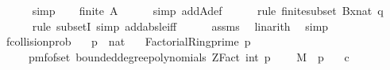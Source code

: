 \begin{isabellebody}
\ \ \ \ \isamarkupfalse%
\ simp\isanewline
\ \ \isamarkupfalse%
\ {\isachardoublequoteopen}finite\ A{\isachardoublequoteclose}\isanewline
\ \ \ \ \isamarkupfalse%
\ {\isacharparenleft}{\kern0pt}simp\ add{\isacharcolon}{\kern0pt}A{\isacharunderscore}{\kern0pt}def{\isacharparenright}{\kern0pt}\isanewline
\ \ \ \ \isamarkupfalse%
\ {\isacharparenleft}{\kern0pt}rule\ finite{\isacharunderscore}{\kern0pt}subset{\isacharbrackleft}{\kern0pt}\ B{\isacharequal}{\kern0pt}{\isachardoublequoteopen}{\isacharbraceleft}{\kern0pt}{}{\isachardot}{\kern0pt}{\isachardot}{\kern0pt}x{\isacharplus}{\kern0pt}nat\ {\isasymlceil}q{\isasymrceil}{\isacharbraceright}{\kern0pt}{\isachardoublequoteclose}{\isacharbrackright}{\kern0pt}{\isacharparenright}{\kern0pt}\isanewline
\ \ \ \ \isamarkupfalse%
\ {\isacharparenleft}{\kern0pt}rule\ subsetI{\isacharcomma}{\kern0pt}\ simp\ add{\isacharcolon}{\kern0pt}abs{\isacharunderscore}{\kern0pt}le{\isacharunderscore}{\kern0pt}iff{\isacharparenright}{\kern0pt}\isanewline
\ \ \ \ \isamarkupfalse%
\ assms\ \isamarkupfalse%
\ linarith\ \isamarkupfalse%
\ simp\isanewline
{}\isamarkupfalse%
%
\endisatagproof
{\isafoldproof}%
%
\isadelimproof
\isanewline
%
\endisadelimproof
\isanewline
{}\isamarkupfalse%
\ f{}{\isacharunderscore}{\kern0pt}collision{\isacharunderscore}{\kern0pt}prob{\isacharcolon}{\kern0pt}\isanewline
\ \ \ p\ {\isacharcolon}{\kern0pt}{\isacharcolon}{\kern0pt}\ nat\isanewline
\ \ \ {\isachardoublequoteopen}Factorial{\isacharunderscore}{\kern0pt}Ring{\isachardot}{\kern0pt}prime\ p{\isachardoublequoteclose}\isanewline
\ \ \ {\isachardoublequoteopen}{\isasymOmega}\ {\isasymequiv}\ pmf{\isacharunderscore}{\kern0pt}of{\isacharunderscore}{\kern0pt}set\ {\isacharparenleft}{\kern0pt}bounded{\isacharunderscore}{\kern0pt}degree{\isacharunderscore}{\kern0pt}polynomials\ {\isacharparenleft}{\kern0pt}ZFact\ {\isacharparenleft}{\kern0pt}int\ p{\isacharparenright}{\kern0pt}{\isacharparenright}{\kern0pt}\ {}{\isacharparenright}{\kern0pt}{\isachardoublequoteclose}\isanewline
\ \ \ {\isachardoublequoteopen}M\ {\isasymsubseteq}\ {\isacharbraceleft}{\kern0pt}{}{\isachardot}{\kern0pt}{\isachardot}{\kern0pt}{\isacharless}{\kern0pt}p{\isacharbraceright}{\kern0pt}{\isachardoublequoteclose}\isanewline
\ \ \ {\isachardoublequoteopen}c\ {\isasymge}\ {}{\isachardoublequoteclose}\isanewline

\end{isabellebody}

